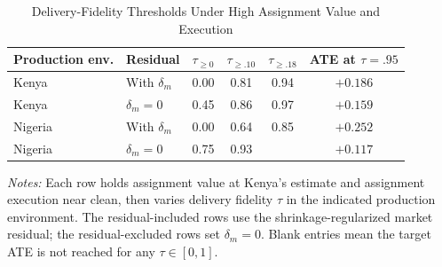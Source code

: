\begin{table}[H]
\centering
\caption{Delivery-Fidelity Thresholds Under High Assignment Value and Execution}
\label{tab:struct_delivery_thresholds}
\begin{threeparttable}
\footnotesize
\begin{tabular}[t]{@{}llcccc@{}}
\toprule
Production env. & Residual & $\tau_{\geq 0}$ & $\tau_{\geq .10}$ & $\tau_{\geq .18}$ & ATE at $\tau=.95$ \\
\midrule
Kenya & With $\delta_m$ & 0.00 & 0.81 & 0.94 & $+0.186$ \\
Kenya & $\delta_m=0$ & 0.45 & 0.86 & 0.97 & $+0.159$ \\
Nigeria & With $\delta_m$ & 0.00 & 0.64 & 0.85 & $+0.252$ \\
Nigeria & $\delta_m=0$ & 0.75 & 0.93 &  & $+0.117$ \\
\bottomrule
\end{tabular}
\begin{tablenotes}
\footnotesize
\item \textit{Notes:} Each row holds assignment value at Kenya's estimate and assignment execution near clean, then varies delivery fidelity $\tau$ in the indicated production environment. The residual-included rows use the shrinkage-regularized market residual; the residual-excluded rows set $\delta_m=0$. Blank entries mean the target ATE is not reached for any $\tau\in[0,1]$.
\end{tablenotes}
\end{threeparttable}
\end{table}
